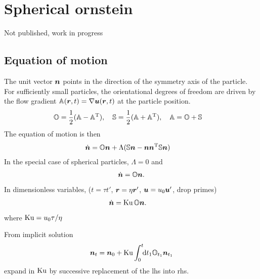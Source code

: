 \documentclass[thesis.tex]{subfiles}
\begin{document}
\chapter{Spherical ornstein}

Not published, work in progress

\section{Equation of motion}
The unit vector $\mbox{\boldmath$n$}$ points in the direction of the symmetry axis of the particle. For sufficiently small particles, the orientational degrees of freedom are driven by the flow gradient $\mathbb{A}(\mbox{\boldmath$r$}, t) = \nabla \mbox{\boldmath$u$}(\mbox{\boldmath$r$}, t)$ at the particle position. 
\begin{align*}
	&\mathbb{O} = \frac{1}{2}(\mathbb{A} - \mathbb{A}^{\mathrm T}),\quad
	\mathbb{S} = \frac{1}{2}(\mathbb{A} + \mathbb{A}^{\mathrm T}),\quad
	\mathbb{A} = \mathbb{O} + \mathbb{S}
\end{align*}
The equation of motion is then
\begin{align*}
	\dot{\mbox{\boldmath$n$}} &= \mathbb{O} \mbox{\boldmath$n$} + \Lambda (\mathbb{S} \mbox{\boldmath$n$} - \mbox{\boldmath$n$} \mbox{\boldmath$n$}^{\mathrm T}\mathbb{S} \mbox{\boldmath$n$})
\end{align*}
In the special case of spherical particles, $\Lambda=0$ and
\begin{align*}
	\dot{\mbox{\boldmath$n$}} &= \mathbb{O} \mbox{\boldmath$n$}. \\
\end{align*}
In dimensionless variables, ($t=\tau t'$, $\mbox{\boldmath$r$} = \eta \mbox{\boldmath$r$}'$, $\mbox{\boldmath$u$} = u_0 \mbox{\boldmath$u$}'$, drop primes)
\begin{align*}
	\dot{\mbox{\boldmath$n$}} &= \mbox{Ku}\,\mathbb{O} \mbox{\boldmath$n$}.
\end{align*}
where $\mbox{Ku} = u_0 \tau / \eta$

From implicit solution
\begin{align*}
	\mbox{\boldmath$n$}_t &= \mbox{\boldmath$n$}_0 + \mbox{Ku}\int_0^t \!\!\mathrm{d} t_1 \mathbb{O}_{t_1} \mbox{\boldmath$n$}_{t_1} \\
\end{align*}
expand in $\mbox{Ku}$ by successive replacement of the lhs into rhs.
\end{document}
